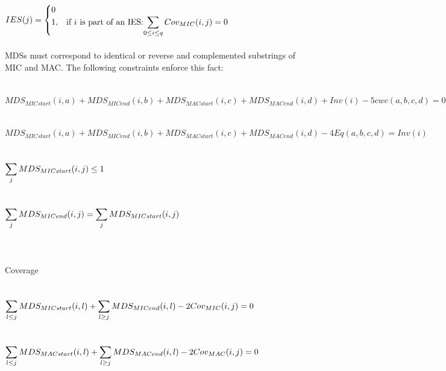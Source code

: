 $IES(j) = \begin{cases} 0 \\ 1, & \mbox{if } i \mbox{ is part of an IES:} \mathlarger{\sum_{0 \leq i \leq q} Cov_{MIC}(i,j) = 0} \end{cases}$

\paragraph{}MDSs must correspond to identical or reverse and complemented substrings of MIC and MAC. The following constraints enforce this fact:
\\\\\\
$MDS_{MICstart}(i,a) + MDS_{MICend}(i,b) + MDS_{MACstart}(i,c) + MDS_{MACend}(i,d) + Inv(i) - 5 cwc(a,b,c,d) = 0$ \\\\\\
$MDS_{MICstart}(i,a) + MDS_{MICend}(i,b) + MDS_{MACstart}(i,c) + MDS_{MACend}(i,d) - 4 Eq(a,b,c,d) = Inv(i)$ \\\\\\
$\mathlarger{\sum_{j} MDS_{MICstart}(i,j)\leq 1}$ \\\\\\
$\mathlarger{\sum_{j} MDS_{MICend}(i,j) = \sum_{j} MDS_{MICstart}(i,j)}$ \\\\\\

\paragraph{} Coverage
\\\\\\
$\mathlarger{\sum_{l\leq j} MDS_{MICstart}(i,l) + \sum_{l\geq j}MDS_{MICend}(i,l) - 2Cov_{MIC}(i,j) = 0}$ \\\\\\
$\mathlarger{\sum_{l\leq j} MDS_{MACstart}(i,l) + \sum_{l\geq j}MDS_{MACend}(i,l) - 2Cov_{MAC}(i,j) = 0}$ \\\\\\